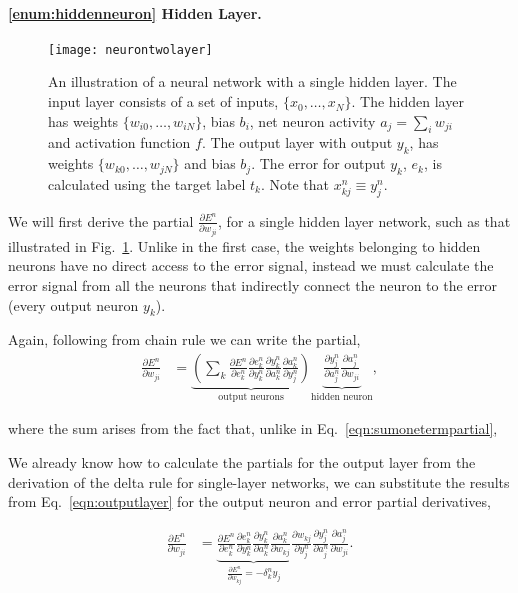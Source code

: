 \documentclass[thesis]{subfiles}
\begin{document}
\paragraph{\ref{enum:hiddenneuron} Hidden Layer.}
\begin{figure}[tbp]
\centering
\texttt{[image: neurontwolayer]}
\caption[An illustration of a neural network with a single hidden layer]{An illustration of a neural network with a single hidden layer. The input layer consists of a set of inputs, $\{x_{0}, \ldots, x_{N}\}$. The hidden layer has weights $\{w_{i0}, \ldots, w_{iN}\}$, bias $b_i$, net neuron activity $a_j = \sum_i w_{ji}$ and activation function $f$. The output layer with output $y_k$, has weights $\{w_{k0}, \ldots, w_{jN}\}$ and bias $b_j$. The error for output $y_k$, $e_k$, is calculated using the target label $t_k$. Note that $x^n_{kj} \equiv y^n	_j$.}
\label{fig:neurontwolayer}
\end{figure}
We will first derive the partial $\frac{\partial E^n}{\partial w_{ji}}$, for a single hidden layer network, such as that illustrated in Fig.~\ref{fig:neurontwolayer}. Unlike in the first case, the weights belonging to hidden neurons have no direct access to the error signal, instead we must calculate the error signal from all the neurons that indirectly connect the neuron to the error (\ie every output neuron $y_k$).

Again, following from chain rule we can write the partial,
\begin{equation}
\begin{aligned}
    \frac{\partial E^n}{\partial w_{ji}} &= \underbrace{\left( \sum_k \frac{\partial E^n}{\partial e^n_{k}}
     \frac{\partial e^n_{k}}{\partial y^n_{k}} \frac{\partial y^n_{k}}{\partial a^n_k} \frac{\partial a^n_k}{\partial y^n_{j}}\right)}_\text{output neurons}
     \underbrace{\frac{\partial y^n_{j}}{\partial a^n_{j}} \frac{\partial a^n_{j}}{\partial w_{ji}}}_\text{hidden neuron},
     \label{eqn:twolayer1}
\end{aligned}
\end{equation}

where the sum arises from the fact that, unlike in Eq.~\ref{eqn:sumonetermpartial}, 

We already know how to calculate the partials for the output layer from the derivation of the delta rule for single-layer networks, we can substitute the results from Eq.~\ref{eqn:outputlayer} for the output neuron and error partial derivatives,

\begin{equation}
\begin{aligned}
    \frac{\partial E^n}{\partial w_{ji}} &= \underbrace{\frac{\partial E^n}{\partial e^n_{k}}
     \frac{\partial e^n_{k}}{\partial y^n_{k}} \frac{\partial y^n_{k}}{\partial a^n_k} \frac{\partial a^n_k}{\partial w_{kj}}}_{\frac{\partial E^n}{\partial w_{kj}} = -\delta^n_k y_{j}}
     \frac{\partial w_{kj}}{\partial y^n_{j}}\frac{\partial y^n_{j}}{\partial a^n_{j}} \frac{\partial a^n_{j}}{\partial w_{ji}}.
\end{aligned}
\end{equation}
\end{document}

